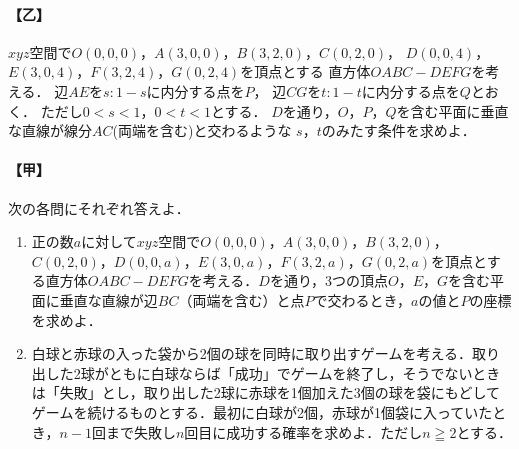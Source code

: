 \documentclass[../../main.tex]{subfiles}
\begin{document}
\paragraph{【乙】}
$xyz$空間で$O(0,0,0)$，$A(3,0,0)$，$B(3,2,0)$，$C(0,2,0)$，
$D(0,0,4)$，$E(3,0,4)$，$F(3,2,4)$，$G(0,2,4)$を頂点とする
直方体$OABC-DEFG$を考える．
辺$AE$を$s:1-s$に内分する点を$P$，
辺$CG$を$t:1-t$に内分する点を$Q$とおく．
ただし$0<s<1$，$0<t<1$とする．
$D$を通り，$O$，$P$，$Q$を含む平面に垂直な直線が線分$AC$(両端を含む)と交わるような
$s$，$t$のみたす条件を求めよ．

\paragraph{【甲】}
次の各問にそれぞれ答えよ．
\begin{enumerate}
  \item 正の数$a$に対して$xyz$空間で$O(0,0,0)$，$A(3,0,0)$，$B(3,2,0)$，$C(0,2,0)$，$D(0,0,a)$，$E(3,0,a)$，$F(3,2,a)$，$G(0,2,a)$を頂点とする直方体$OABC-DEFG$を考える．$D$を通り，3つの頂点$O$，$E$，$G$を含む平面に垂直な直線が辺$BC$（両端を含む）と点$P$で交わるとき，$a$の値と$P$の座標を求めよ．
  \item 白球と赤球の入った袋から2個の球を同時に取り出すゲームを考える．取り出した2球がともに白球ならば「成功」でゲームを終了し，そうでないときは「失敗」とし，取り出した2球に赤球を1個加えた3個の球を袋にもどしてゲームを続けるものとする．最初に白球が2個，赤球が1個袋に入っていたとき，$n-1$回まで失敗し$n$回目に成功する確率を求めよ．ただし$n \geqq 2$とする．
\end{enumerate}
\end{document}
